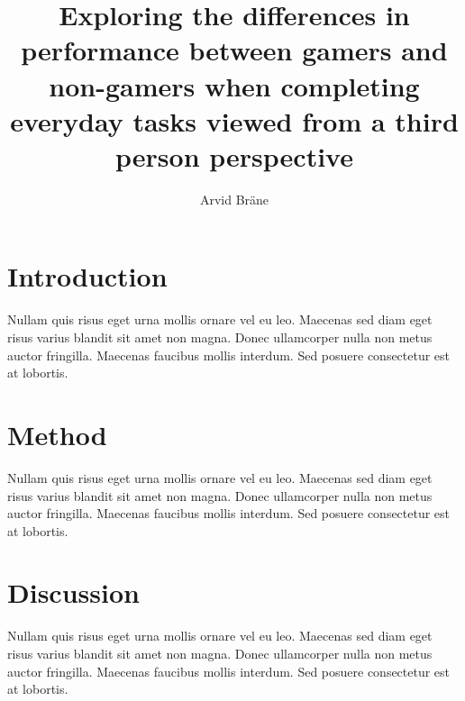 \documentclass[runningheads,a4paper,oribibl]{llncs}
\begin{document}
\pagestyle{headings}

\mainmatter

\title{Exploring the differences in performance between gamers and non-gamers when completing everyday tasks viewed from a third person perspective}



\author{Arvid Bräne}


\maketitle



\section{Introduction}
Nullam quis risus eget urna mollis ornare vel eu leo. Maecenas sed diam eget risus varius blandit sit amet non magna. Donec ullamcorper nulla non metus auctor fringilla. Maecenas faucibus mollis interdum. Sed posuere consectetur est at lobortis.

\section{Method}
Nullam quis risus eget urna mollis ornare vel eu leo. Maecenas sed diam eget risus varius blandit sit amet non magna. Donec ullamcorper nulla non metus auctor fringilla. Maecenas faucibus mollis interdum. Sed posuere consectetur est at lobortis.


\section{Discussion}
Nullam quis risus eget urna mollis ornare vel eu leo. Maecenas sed diam eget risus varius blandit sit amet non magna. Donec ullamcorper nulla non metus auctor fringilla. Maecenas faucibus mollis interdum. Sed posuere consectetur est at lobortis.





\end{document}
